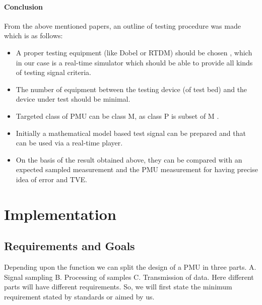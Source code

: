 \subsubsection{Conclusion}
From the above mentioned papers, an outline of testing procedure was made which is as follows:
\begin{itemize}
	\item A proper testing equipment (like Dobel or RTDM) should be chosen \cite{Paper:saugata}, which in our case is a real-time simulator which should be able to provide all kinds of testing signal criteria.
	\item The number of equipment between the testing device (of test bed) and the device under test should be minimal.
	\item Targeted class of PMU can be class M, as class P is subset of M \cite{paper:nrendra}.
	\item Initially a mathematical model based test signal can be prepared and that can be used via a real-time player.
	\item On the basis of the result obtained above, they can be compared with an expected sampled measurement and the PMU measurement for having precise idea of error and TVE.
\end{itemize}


\chapter{Implementation}
\section{Requirements and Goals}
Depending upon the function we can split the design of a PMU in three parts. 
A. Signal sampling
B. Processing of samples  
C. Transmission of data.
Here different parts will have different requirements. So, we will first state the minimum requirement stated by standards or aimed by us.

